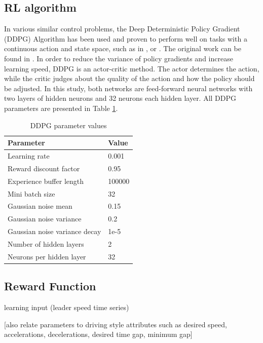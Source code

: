 \documentclass[review]{elsarticle}
\begin{document}
\subsection{RL algorithm}
In various similar control problems, the Deep Deterministic Policy Gradient (DDPG) Algorithm has been used and proven to perform well on tasks with a continuous action and state space, such as in \cite{SafeEfficientAndComfortable}, \cite{ComparisonRLvsMPC} or \cite{HumanLikeAutonomouCF}. The original work can be found in \cite{DDPG}. In order to reduce the variance of policy gradients and increase learning speed, DDPG is an actor-critic method. The actor determines the action, while the critic judges about the quality of the action and how the policy should be adjusted. In this study, both networks are feed-forward neural networks with two layers of hidden neurons and 32 neurons each hidden layer. All DDPG parameters are presented in Table \ref{tab:DDPGparameters}.

\begin{table}
	\caption{DDPG parameter values} 
	\label{tab:DDPGparameters} 
	\begin{center}
		\begin{tabular}{ p{} p{} }
			Parameter & Value \\ \hline
			Learning rate & 0.001 \\ 
			Reward discount factor & 0.95 \\ 
			Experience buffer length & 100000 \\ 
			Mini batch size & 32 \\ 			
			Gaussian noise mean & 0.15 \\ 
			Gaussian noise variance & 0.2 \\ 
			Gaussian noise variance decay  & 1e-5 \\ 
			Number of hidden layers & 2\\
			Neurons per hidden layer & 32\\
			

		\end{tabular}
	\end{center}
\end{table}


\subsection{Reward Function}

learning input (leader speed time series)

[also relate parameters to driving style attributes such as desired
speed, accelerations, decelerations, desired time gap, minimum gap]
\end{document}
